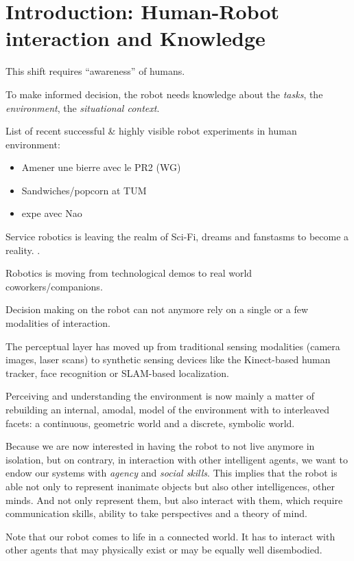 \chapter{Introduction: Human-Robot interaction and Knowledge}
\label{chapter|introduction}


This shift requires ``awareness'' of humans.

To make informed decision, the robot needs knowledge about the \emph{tasks},
the \emph{environment}, the \emph{situational context}.

List of recent successful \& highly visible robot experiments in human environment:
\begin{itemize}
    \item Amener une bierre avec le PR2 (WG)
    \item Sandwiches/popcorn at TUM
    \item expe avec Nao
\end{itemize}

Service robotics is leaving the realm of Sci-Fi, dreams and fanstasms to become
a reality. . 

Robotics is moving from technological demos to real world coworkers/companions.


Decision making on the robot can not anymore rely on a single or a few
modalities of interaction.

The perceptual layer has moved up from traditional sensing modalities (camera
images, laser scans) to synthetic sensing devices like the Kinect-based human
tracker, face recognition or SLAM-based localization.

Perceiving and understanding the environment is now mainly a matter of
rebuilding an internal, amodal, model of the environment with to interleaved
facets: a continuous, geometric world and a discrete, symbolic world.

Because we are now interested in having the robot to not live anymore in
isolation, but on contrary, in interaction with other intelligent agents, we
want to endow our systems with \emph{agency} and \emph{social skills}. This
implies that the robot is able not only to represent inanimate objects but also
other intelligences, other minds. And not only represent them, but also
interact with them, which require communication skills, ability to take
perspectives and a theory of mind.

Note that our robot comes to life in a connected world. It has to interact with
other agents that may physically exist or may be equally well disembodied.


